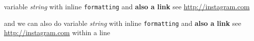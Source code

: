 
variable \emph{string} with inline \verb|formatting| and \textbf{also a link} see \url{http://instagram.com}

and we can also do variable \emph{string} with inline \verb|formatting| and \textbf{also a link} see \url{http://instagram.com} within a line